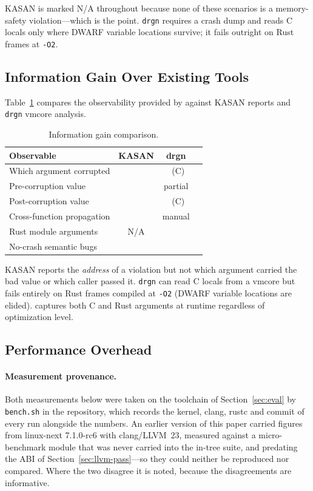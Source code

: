 \documentclass{article}
\newcommand{\cmark}{\ding{51}}
\newcommand{\xmark}{\ding{55}}
\begin{document}
\noindent KASAN is marked N/A throughout because none of these scenarios is a
memory-safety violation---which is the point. \texttt{drgn} requires a crash
dump and reads C locals only where DWARF variable locations survive; it fails
outright on Rust frames at \texttt{-O2}.

\subsection{Information Gain Over Existing Tools}

Table~\ref{tab:infogain} compares the observability provided by \toolname{}
against KASAN reports and \texttt{drgn} vmcore analysis.

\begin{table}[t]
\centering
\caption{Information gain comparison.}\label{tab:infogain}
\small
\begin{tabular}{@{}lccc@{}}
\toprule
\textbf{Observable} & \textbf{KASAN} & \textbf{drgn} & \textbf{\toolname{}} \\
\midrule
Which argument corrupted & \xmark & \cmark~(C) & \cmark \\
Pre-corruption value & \xmark & partial & \cmark \\
Post-corruption value & \xmark & \cmark~(C) & \cmark \\
Cross-function propagation & \xmark & manual & \cmark \\
Rust module arguments & N/A & \xmark & \cmark \\
No-crash semantic bugs & \xmark & \xmark & \cmark \\
\bottomrule
\end{tabular}
\end{table}

KASAN reports the \emph{address} of a violation but not which argument carried
the bad value or which caller passed it. \texttt{drgn} can read C locals from a
vmcore but fails entirely on Rust frames compiled at \texttt{-O2} (DWARF
variable locations are elided). \toolname{} captures both C and Rust arguments
at runtime regardless of optimization level.

\subsection{Performance Overhead}

\paragraph{Measurement provenance.} Both measurements below were taken on the
toolchain of Section~\ref{sec:eval} by \texttt{bench.sh} in the repository,
which records the kernel, clang, rustc and commit of every run alongside the
numbers. An earlier version of this paper carried figures from linux-next
7.1.0-rc6 with clang/LLVM~23, measured against a micro-benchmark module that
was never carried into the in-tree suite, and predating the ABI of
Section~\ref{sec:llvm-pass}---so they could neither be reproduced nor
compared. Where the two disagree it is noted, because the disagreements are
informative.
\end{document}
